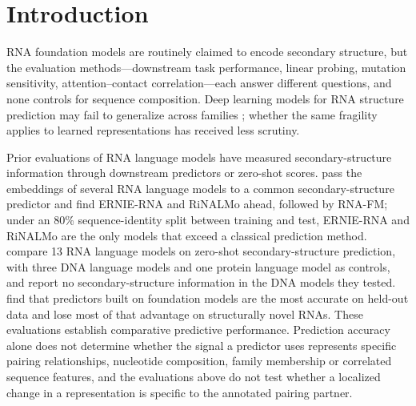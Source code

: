 \documentclass[11pt]{article}
\begin{document}
\section{Introduction}
\label{sec:intro}

RNA foundation models are routinely claimed to encode secondary structure,
but the evaluation methods---downstream task performance, linear probing,
mutation sensitivity, attention--contact correlation---each answer different
questions, and none controls for sequence composition. Deep learning models
for RNA structure prediction may fail to generalize across families
\citep{szikszai2022generalization}; whether the same fragility applies to
learned representations has received less scrutiny.

Prior evaluations of RNA language models have measured secondary-structure
information through downstream predictors or zero-shot scores.
\citet{zablocki2025benchmarking} pass the embeddings of several RNA language
models to a common secondary-structure predictor and find ERNIE-RNA and RiNALMo
ahead, followed by RNA-FM; under an 80\% sequence-identity split between
training and test, ERNIE-RNA and RiNALMo are the only models that exceed a
classical prediction method. \citet{wang2025comparative} compare 13 RNA
language models on zero-shot secondary-structure prediction, with three DNA
language models and one protein language model as controls, and report no
secondary-structure information in the DNA models they tested.
\citet{chen2026fair} find that predictors built on foundation models are the
most accurate on held-out data and lose most of that advantage on structurally
novel RNAs. These evaluations establish comparative predictive performance.
Prediction accuracy alone does not determine whether the signal a predictor
uses represents specific pairing relationships, nucleotide composition, family
membership or correlated sequence features, and the evaluations above do not
test whether a localized change in a representation is specific to the
annotated pairing partner.
\end{document}
